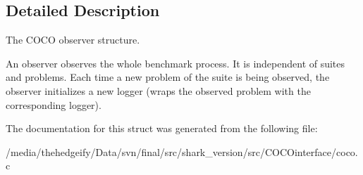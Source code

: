 \subsection{Detailed Description}
The C\+O\+CO observer structure. 

An observer observes the whole benchmark process. It is independent of suites and problems. Each time a new problem of the suite is being observed, the observer initializes a new logger (wraps the observed problem with the corresponding logger). 

The documentation for this struct was generated from the following file\+:\begin{DoxyCompactItemize}
\item 
/media/thehedgeify/\+Data/svn/final/src/shark\+\_\+version/src/\+C\+O\+C\+Ointerface/coco.\+c\end{DoxyCompactItemize}
